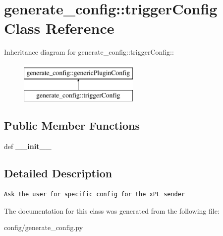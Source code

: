 \hypertarget{classgenerate__config_1_1triggerConfig}{
\section{generate\_\-config::triggerConfig Class Reference}
\label{classgenerate__config_1_1triggerConfig}
}
Inheritance diagram for generate\_\-config::triggerConfig::\begin{figure}[H]
\begin{center}
\leavevmode
\includegraphics[height=2cm]{classgenerate__config_1_1triggerConfig}
\end{center}
\end{figure}
\subsection*{Public Member Functions}
\begin{CompactItemize}
\item 
\hypertarget{classgenerate__config_1_1triggerConfig_40e2f872feeb29963472a73ca7937dfd}{
def \textbf{\_\-\_\-init\_\-\_\-}}
\label{classgenerate__config_1_1triggerConfig_40e2f872feeb29963472a73ca7937dfd}

\end{CompactItemize}


\subsection{Detailed Description}


\footnotesize\begin{verbatim}
Ask the user for specific config for the xPL sender
\end{verbatim}
\normalsize
 

The documentation for this class was generated from the following file:\begin{CompactItemize}
\item 
config/generate\_\-config.py\end{CompactItemize}
